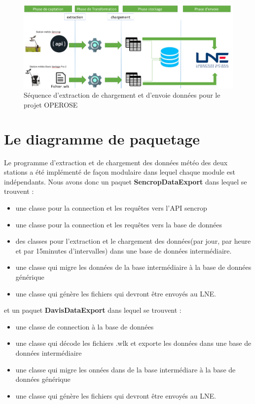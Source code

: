 \begin{figure}[!h]
    \centering
     \includegraphics[width=1\textwidth]{images/processusOperose.png}
     \caption{ Séquence d'extraction de chargement et d'envoie données pour le projet OPEROSE}
     \label{diagremme de séquence station Davis}
\end{figure}

\section{Le diagramme de paquetage}
Le programme d'extraction et de chargement des données météo des deux stations a été implémenté de façon modulaire dans lequel chaque module est indépendants. Nous avons donc un paquet \textbf{SencropDataExport} dans lequel se trouvent :
\begin{itemize}
    \item une classe pour la connection et les requêtes vers l'API sencrop
    \item une classe pour la connection et les requêtes vers la base de données
    \item des classes pour l'extraction et le chargement des données(par jour, par heure et par 15minutes d'intervalles) dans une base de données intermédiaire.
    \item une classe qui migre les données de la base intermédiaire à la base de données générique
    \item une classe qui génère les fichiers qui devront être envoyés au LNE.
\end{itemize}
et un paquet \textbf{DavisDataExport} dans lequel se trouvent : 
\begin{itemize}
    \item une classe de connection à la base de données
    \item une classe qui décode les fichiers .wlk  et exporte les données dans une base de données intermédiaire
    \item une classe qui migre les onnées dans de la base intermédiare à la base de données générique
    \item une classe qui génère les fichiers qui devront être envoyés au LNE.
\end{itemize}

